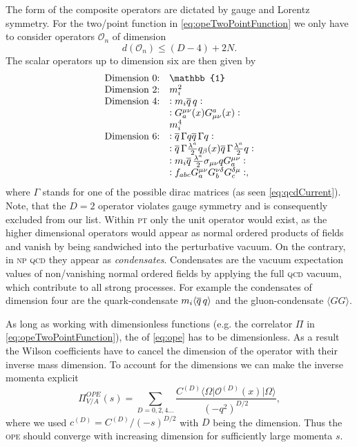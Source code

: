 \documentclass[../../index.tex]{subfiles}
\begin{document}
The form of the composite operators are dictated by gauge and Lorentz symmetry.
For the two\-/point function in \cref{eq:opeTwoPointFunction} we only have to
consider operators \(\mathcal{O}_n\) of dimension
\begin{equation}
  d \left( \mathcal{O}_n \right) \leq (D - 4) + 2N.
\end{equation}
The scalar operators up to dimension six are then given by \cite{Pascual1984}
\begin{equation}
  \begin{array}{ll}
    \text{Dimension 0:} & \mathbb{1} \\
    \text{Dimension 2:} & m_i^2 \\
    \text{Dimension 4:} & :m_i \anti{q} q: \\
                        & :G_a^{\mu\nu}(x) G_{\mu\nu}^a(x): \\
                        & m_i^4 \\
    \text{Dimension 6:} & :\anti{q} \Gamma q \anti{q} \Gamma q: \\
                        & :\anti{q} \Gamma \frac{\lambda^a}{2} q_\beta(x) \anti{q} \Gamma \frac{\lambda^a}{2} q: \\
                        & :m_i \anti{q} \frac{\lambda^a}{2} \sigma_{\mu\nu} q G^{\mu\nu}_a: \\
                        & :f_{abc} G_a^{\mu\nu} G_b^{\nu\delta} G_c^{\delta\mu}:,
  \end{array}
\end{equation}
where \(\Gamma\) stands for one of the possible dirac matrices (as seen
\cref{eq:qcdCurrent}). Note, that the \(D=2\) operator violates gauge symmetry
and is consequently excluded from our list. Within \textsc{pt} only the unit
operator would exist, as the higher dimensional operators would appear as normal
ordered products of fields and vanish by being sandwiched into the perturbative
vacuum. On the contrary, in \textsc{np qcd} they appear as \textit{condensates}.
Condensates are the vacuum expectation values of non\-/vanishing normal ordered
fields by applying the full \textsc{qcd} vacuum, which contribute to all strong
processes. For example the condensates of dimension four are the
quark-condensate \(m_i\langle \overline{q}\, q \rangle\) and the gluon-condensate
\(\langle GG \rangle\).

As long as working with dimensionless functions (e.g. the correlator \(\Pi\) in
\cref{eq:opeTwoPointFunction}), the  of
\cref{eq:ope} has to be dimensionless. As a result the Wilson coefficients have
to cancel the dimension of the operator with their inverse mass dimension. To
account for the dimensions we can make the inverse momenta explicit
\begin{equation}
  \Pi_{V/A}^{OPE}(s) = \sum_{D=0,2,4\dots} \frac{C^{(D)}
    \langle\Omega\vert \mathcal{O}^{(D)}(x) \vert\Omega\rangle}{(-q^2)^{D/2}},
\end{equation}
where we used \(c^{(D)}=C^{(D)}/(-s)^{D/2}\) with \(D\) being the dimension.
Thus the \textsc{ope} should converge with increasing dimension for sufficiently
large momenta \(s\).
\end{document}
